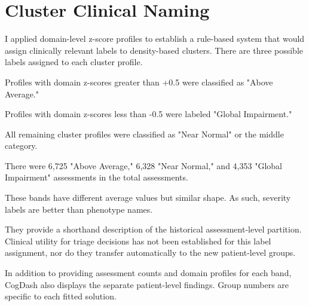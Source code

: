 \section{Cluster Clinical Naming}\label{sec:cluster_names}
I applied domain-level z-score profiles to establish a rule-based system that would assign clinically relevant labels to density-based clusters. There are three possible labels assigned to each cluster profile.

Profiles with domain z-scores greater than +0.5 were classified as "Above Average."

Profiles with domain z-scores less than -0.5 were labeled "Global Impairment."

All remaining cluster profiles were classified as "Near Normal" or the middle category.

There were 6,725 "Above Average," 6,328 "Near Normal," and 4,353 "Global Impairment" assessments in the total assessments.

These bands have different average values but similar shape. As such, severity labels are better than phenotype names.

They provide a shorthand description of the historical assessment-level partition. Clinical utility for triage decisions has not been established for this label assignment, nor do they transfer automatically to the new patient-level groups.

In addition to providing assessment counts and domain profiles for each band, CogDash also displays the separate patient-level findings. Group numbers are specific to each fitted solution.


